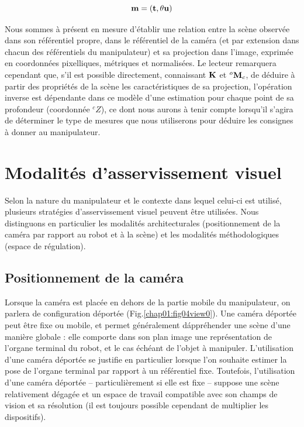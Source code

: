 \begin{equation}
{\bf m} = ({\bf t}, \theta {\bf u})  
\label{chap01:eq10}
\end{equation}

Nous sommes \`a pr\'esent en mesure d'établir une relation entre la scène 
observée dans son référentiel propre, dans le r\'ef\'erentiel de la cam\'era (et 
par extension dans chacun des r\'ef\'erentiels du manipulateur) et sa projection 
dans l'image, exprimée en coordonnées pixelliques, métriques et normalisées. Le 
lecteur remarquera cependant que, s'il est possible directement, connaissant 
${\bf K}$ et ${}^o{\bf M}_c$, de déduire à partir des propriétés de la scène 
les caractéristiques de sa projection, l'opération inverse est dépendante dans 
ce modèle d'une estimation pour chaque point de sa profondeur (coordonnée 
${}^cZ$), ce dont nous aurons \`a tenir compte lorsqu'il s'agira de d\'eterminer 
le type de mesures que nous utiliserons pour d\'eduire les consignes \`a donner 
au manipulateur.

\section{Modalit\'es d'asservissement visuel} 
\label{chap1-1}

Selon la nature du manipulateur et le contexte dans lequel celui-ci est 
utilis\'e, plusieurs strat\'egies d'asservissement visuel peuvent \^etre 
utilis\'ees. Nous distinguons en particulier les modalit\'es architecturales 
(positionnement de la cam\'era par rapport au robot et \`a la sc\`ene) et les 
modalit\'es m\'ethodologiques (espace de r\'egulation).

\subsection{Positionnement de la caméra} \label{chap1-1-0}

Lorsque la cam\'era est plac\'ee en dehors de la partie mobile du manipulateur, 
on parlera de configuration déportée (Fig.\ref{chap01:fig04view0}). Une cam\'era 
d\'eport\'ee peut \^etre fixe ou mobile, et permet g\'en\'eralement 
d\'appr\'ehender une sc\`ene d'une mani\`ere globale : elle comporte dans son 
plan image une repr\'esentation de l'organe terminal du robot, et le cas 
\'ech\'eant de l'objet \`a manipuler. L'utilisation d'une cam\'era d\'eport\'ee 
se justifie en particulier lorsque l'on souhaite estimer la pose de l'organe 
terminal par rapport \`a un r\'ef\'erentiel fixe. Toutefois, l'utilisation d'une 
cam\'era d\'eport\'ee -- particuli\`erement si elle est fixe -- suppose une 
sc\`ene relativement d\'egag\'ee et un espace de travail compatible avec son 
champs de vision et sa r\'esolution (il est toujours possible cependant de 
multiplier les dispositifs).

